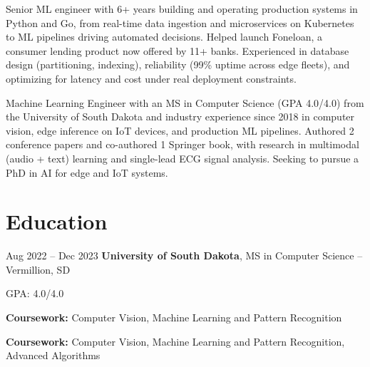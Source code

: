         \begin{onecolentry}
            Senior ML engineer with 6+ years building and operating production systems in Python and Go, from real-time data ingestion and microservices on Kubernetes to ML pipelines driving automated decisions. Helped launch Foneloan, a consumer lending product now offered by 11+ banks. Experienced in database design (partitioning, indexing), reliability (99\% uptime across edge fleets), and optimizing for latency and cost under real deployment constraints.
        \end{onecolentry}

        \begin{onecolentry}
            Machine Learning Engineer with an MS in Computer Science (GPA 4.0/4.0) from the University of South Dakota and industry experience since 2018 in computer vision, edge inference on IoT devices, and production ML pipelines. Authored 2 conference papers and co-authored 1 Springer book, with research in multimodal (audio + text) learning and single-lead ECG signal analysis. Seeking to pursue a PhD in AI for edge and IoT systems.
        \end{onecolentry}

    \section{Education}

        \begin{twocolentry}{
            Aug 2022 – Dec 2023
        }
            \textbf{University of South Dakota}, MS in Computer Science -- Vermillion, SD\end{twocolentry}

        \vspace{0.06 cm}
        \begin{onecolentry}
            \begin{highlights}
                \item GPA: 4.0/4.0
                \item \textbf{Coursework:} Computer Vision, Machine Learning and Pattern Recognition
                \item \textbf{Coursework:} Computer Vision, Machine Learning and Pattern Recognition, Advanced Algorithms
            \end{highlights}
        \end{onecolentry}

